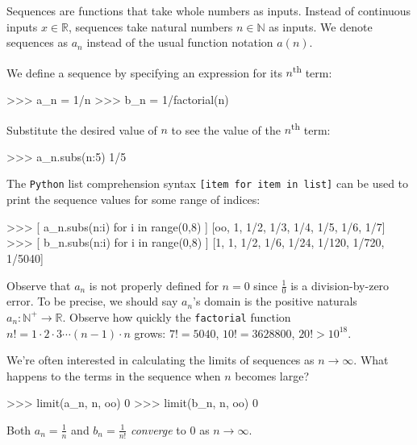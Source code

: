 Sequences are functions that take whole numbers as inputs.
Instead of continuous inputs $x\in \mathbb{R}$,
sequences take natural numbers $n\in\mathbb{N}$ as inputs.
We denote sequences as $a_n$ instead of the usual function notation $a(n)$.

We define a sequence by specifying an expression for its $n$\textsuperscript{th} term:



\small
\begin{verbatimtab}
>>> a_n = 1/n
>>> b_n = 1/factorial(n)
\end{verbatimtab}
\normalsize

\noindent
Substitute the desired value of $n$ to see the value of the $n$\textsuperscript{th} term:

\small
\begin{verbatimtab}
>>> a_n.subs({n:5})
1/5
\end{verbatimtab}
\normalsize

\noindent
The \texttt{Python} list comprehension syntax \texttt{[item for item in list]}
can be used to print the sequence values for some range of indices:



\small
\begin{verbatimtab}
>>> [ a_n.subs({n:i}) for i in range(0,8) ]
[oo, 1, 1/2, 1/3, 1/4,  1/5,   1/6,   1/7]  
>>> [ b_n.subs({n:i}) for i in range(0,8) ]
[1,  1, 1/2, 1/6, 1/24, 1/120, 1/720, 1/5040]
\end{verbatimtab}
\normalsize

\noindent
Observe that $a_n$ is not properly defined for $n=0$ since $\frac{1}{0}$ is a division-by-zero error.
To be precise, we should say $a_n$'s domain is the positive naturals $a_n:\mathbb{N}^+ \to \mathbb{R}$.
Observe how quickly the \texttt{factorial} function $n!=1\cdot2\cdot3\cdots(n-1)\cdot n$ grows:
$7!= 5040$, $10!=3628800$, $20! > 10^{18}$.



We're often interested in calculating the limits of sequences as $n\to \infty$.
What happens to the terms in the sequence when $n$ becomes large?

\small
\begin{verbatimtab}
>>> limit(a_n, n, oo)
0
>>> limit(b_n, n, oo)
0
\end{verbatimtab}
\normalsize

\noindent
Both $a_n=\frac{1}{n}$ and $b_n = \frac{1}{n!}$ \emph{converge} to $0$ as $n\to\infty$. 

